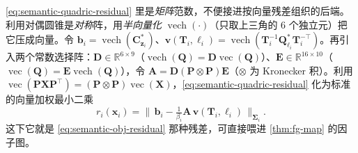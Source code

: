 \begin{derivation}
\cref{eq:semantic-quadric-residual} 里是\emph{矩阵}范数，不便接进按向量残差组织的后端。利用对偶圆锥是\emph{对称}阵，用\emph{半向量化} $\operatorname{vech}(\cdot)$（只取上三角的 $6$ 个独立元）把它压成向量。令 $\mathbf{b}_i=\operatorname{vech}(\mathbf{C}^{*}_{\mathbf{z}_i})$、$\mathbf{v}(\mathbf{T}_i,\boldsymbol\ell_i)=\operatorname{vech}(\mathbf{T}_i^{-1}\mathbf{Q}_{\ell_i}^{*}\mathbf{T}_i^{-\top})$。再引入两个常数选择阵：$\mathbf{D}\in\mathbb{R}^{6\times9}$（$\operatorname{vech}(\mathbf{Q})=\mathbf{D}\operatorname{vec}(\mathbf{Q})$）、$\mathbf{E}\in\mathbb{R}^{16\times10}$（$\operatorname{vec}(\mathbf{Q})=\mathbf{E}\operatorname{vech}(\mathbf{Q})$），令 $\mathbf{A}=\mathbf{D}(\mathbf{P}\otimes\mathbf{P})\mathbf{E}$（$\otimes$ 为 Kronecker 积）。利用 $\operatorname{vec}(\mathbf{P}\mathbf{X}\mathbf{P}^\top)=(\mathbf{P}\otimes\mathbf{P})\operatorname{vec}(\mathbf{X})$，\cref{eq:semantic-quadric-residual} 化为标准的向量加权最小二乘
\[
  r_i(\mathbf{x}_i)=\Big\|\,\mathbf{b}_i-\tfrac{1}{\beta_i}\mathbf{A}\,\mathbf{v}(\mathbf{T}_i,\boldsymbol\ell_i)\,\Big\|_{\boldsymbol\Sigma_i}.
\]
这下它就是 \cref{eq:semantic-obj-residual} 那种残差，可直接喂进 \cref{thm:fg-map} 的因子图\cite{nicholson2019quadricslam,rubino2018quadrics}。
\end{derivation}


